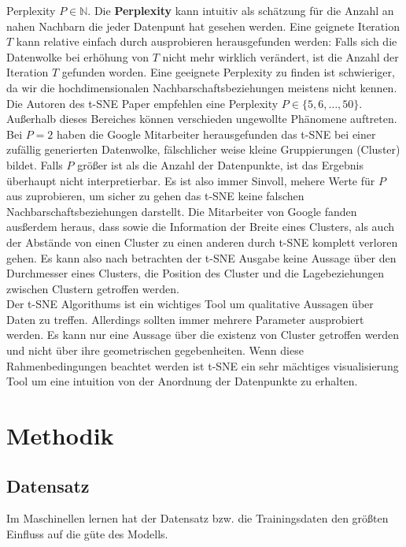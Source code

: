 \documentclass[12pt,letterpaper,ngerman]{article}
\begin{document}
Perplexity $P \in \mathbb{N}$. Die {\bf Perplexity} kann intuitiv als schätzung 
für die Anzahl an nahen Nachbarn die jeder Datenpunt hat gesehen werden.
Eine geignete Iteration $T$ kann relative einfach durch ausprobieren 
herausgefunden werden: Falls sich die Datenwolke bei erhöhung von $T$
nicht mehr wirklich verändert, ist die Anzahl der Iteration $T$ gefunden
worden. Eine geeignete Perplexity zu finden ist schwieriger, da wir die
hochdimensionalen Nachbarschaftsbeziehungen meistens nicht kennen. Die Autoren
des t-SNE Paper empfehlen eine Perplexity $P \in \{5,6, \dots, 50\}$. Außerhalb
dieses Bereiches können verschieden ungewollte Phänomene auftreten. Bei $P=2$
haben die Google Mitarbeiter herausgefunden das t-SNE bei einer zufällig generierten
Datenwolke, fälschlicher weise kleine Gruppierungen (Cluster) bildet. Falls
$P$ größer ist als die Anzahl der Datenpunkte, ist das Ergebnis überhaupt nicht
interpretierbar. Es ist also immer Sinvoll, mehere Werte für $P$ aus zuprobieren,
um sicher zu gehen das t-SNE keine falschen Nachbarschaftsbeziehungen darstellt.
Die Mitarbeiter von Google fanden ausßerdem heraus, dass sowie die Information 
der Breite eines Clusters, als auch der Abstände von einen Cluster zu einen anderen 
durch t-SNE komplett verloren gehen. Es kann also nach betrachten der
t-SNE Ausgabe keine Aussage über den Durchmesser eines Clusters, die Position
des Cluster und die Lagebeziehungen zwischen Clustern getroffen werden. \\
Der t-SNE Algorithums ist ein wichtiges Tool um qualitative Aussagen über 
Daten zu treffen. Allerdings sollten immer mehrere Parameter ausprobiert werden.
Es kann nur eine Aussage über die existenz von Cluster getroffen werden und 
nicht über ihre geometrischen gegebenheiten. Wenn diese Rahmenbedingungen 
beachtet werden ist t-SNE ein sehr mächtiges visualisierung Tool um eine 
intuition von der Anordnung der Datenpunkte zu erhalten.

\section{Methodik}
\subsection{Datensatz}
Im Maschinellen lernen hat der Datensatz bzw. die Trainingsdaten den
größten Einfluss auf die güte des Modells.
\end{document}
